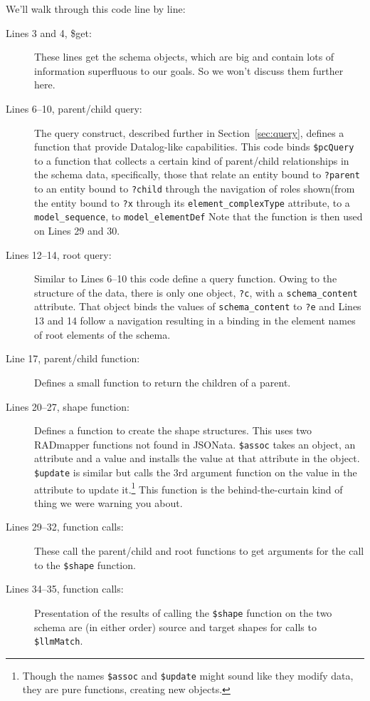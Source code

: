 \documentclass[10pt,letterpaper]{article} %
\newcommand{\stt}[1]{\texttt{#1}} %
\newcommand{\bdef}[1]{\textbf{\textit{#1}}}
\begin{document}
We'll walk through this code line by line:
\begin{description}
\item[Lines 3 and 4, \$get:]
  These lines get the schema objects, which are big and contain lots of information superfluous to our goals.
  So we won't discuss them further here.
\item[Lines 6--10, parent/child query:]
  The query construct, described further in Section~\ref{sec:query}, defines a function that provide Datalog-like capabilities.
  This code binds \stt{\$pcQuery} to a function that collects a certain kind of parent/child relationships in the schema data,
  specifically, those that relate an entity bound to \stt{?parent} to an entity bound to \stt{?child} through
  the navigation of roles shown(from the entity bound to \stt{?x} through its \stt{element\_complexType} attribute, to a \stt{model\_sequence}, to \stt{model\_elementDef}
  Note that the function is then used on Lines 29 and 30.
\item [Lines 12--14, root query:]  Similar to Lines 6--10 this code define a query function.
  Owing to the structure of the data, there is only one object, \stt{?c}, with a \stt{schema\_content} attribute.
  That object binds the values of \stt{schema\_content} to \stt{?e} and Lines 13 and 14 follow a navigation
  resulting in a binding in the element names of root elements of the schema.
\item[Line 17, parent/child function:] Defines a small function to return the children of a parent.
\item[Lines 20--27, shape function:] Defines a function to create the shape structures.
  This uses two RADmapper functions not found in JSONata.
  \stt{\$assoc} takes an object, an attribute and a value and installs the value at that attribute in the object.
  \stt{\$update} is similar but calls the 3rd argument function on the value in the attribute to update it.\footnote{
    Though the names  \stt{\$assoc} and  \stt{\$update} might sound like they modify data, they are pure functions, creating new objects.} This function is the behind-the-curtain kind of thing we were warning you about.
\item[Lines 29--32, function calls:] These call the parent/child and root functions to get arguments for the call to the \stt{\$shape} function.
\item[Lines 34--35, function calls:] Presentation of the results of calling the \stt{\$shape} function on the two schema are (in either order)
  source and target shapes for calls to \stt{\$llmMatch}.
\end{description}
\end{document}
